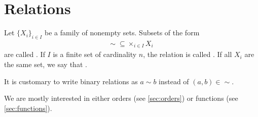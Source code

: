 \section{Relations}\label{sec:relations}

\begin{definition}\label{def:relation}
  Let $\{ X_i \}_{i \in I}$ be a family of nonempty sets.
  Subsets of the form
  \begin{align*}
    \sim\; \subseteq \times_{i \in I} X_i
  \end{align*}
  are called . If $I$ is a finite set of cardinality $n$, the relation is called . If all $X_i$ are the same set, we say that .

  It is customary to write binary relations as $a \sim b$ instead of $(a, b) \in \sim$.
\end{definition}

\begin{note}\label{note:main_relation_types}
  We are mostly interested in either orders (see \cref{sec:orders}) or functions (see \cref{sec:functions}).
\end{note}

